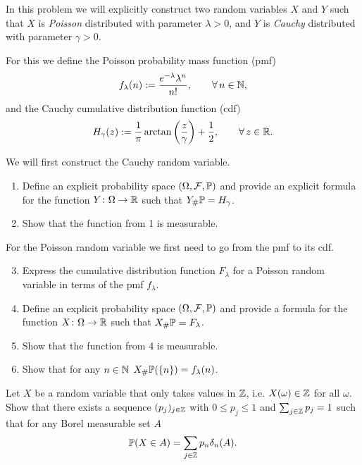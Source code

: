\begin{problem}
In this problem we will	explicitly construct two random variables $X$ and $Y$ such that $X$ is \emph{Poisson} distributed with parameter $\lambda>0$, and $Y$ is \emph{Cauchy} distributed with parameter $\gamma>0$. 

For this we define the Poisson probability mass function (pmf)
\begin{equation}
	f_\lambda(n) := \frac{e^{-\lambda}\lambda^n}{n!},\qquad \forall\,n\in\mathbb N,
\end{equation}
and the Cauchy cumulative distribution function (cdf)
\begin{equation}
	H_\gamma(z) := \frac{1}{\pi}\arctan\left(\frac{z}{\gamma}\right) + \frac{1}{2},\qquad \forall\,z\in\mathbb R.
\end{equation}

We will first construct the Cauchy random variable.
\begin{enumerate}
\item Define an explicit probability space $(\Omega, \mathcal F, \mathbb P)$ and provide an explicit formula for the function $Y\colon \Omega\to\mathbb R$ such that $Y_\# \mathbb P = H_\gamma$.
\item Show that the function from 1 is measurable.
\end{enumerate}

For the Poisson random variable we first need to go from the pmf to its cdf.
\begin{enumerate}
\setcounter{enumi}{2}
\item Express the cumulative distribution function $F_\lambda$ for a Poisson random variable in terms of the pmf $f_\lambda$.
\item Define an explicit probability space $(\Omega, \mathcal F, \mathbb P)$ and provide a formula for the function $X\colon \Omega\to\mathbb R$ such that $X_\# \mathbb P = F_\lambda$.
\item Show that the function from 4 is measurable.
\item Show that for any $n \in \mathbb N$ $X_\# \mathbb P (\{n\}) = f_\lambda(n)$.
\end{enumerate}

\end{problem}

\begin{problem}\label{prb:discrete_random_variable}
Let $X$ be a random variable that only takes values in $\mathbb Z$, i.e. $X(\omega) \in \mathbb Z$ for all $\omega$. Show that there exists a sequence $(p_j)_{j \in \mathbb Z}$ with $0 \le p_j \le 1$ and $\sum_{j \in \mathbb Z} p_j = 1$ such that for any Borel measurable set $A$
\[
	\mathbb P(X \in A) = \sum_{j \in \mathbb Z} p_n \delta_n(A).
\]
\end{problem}

